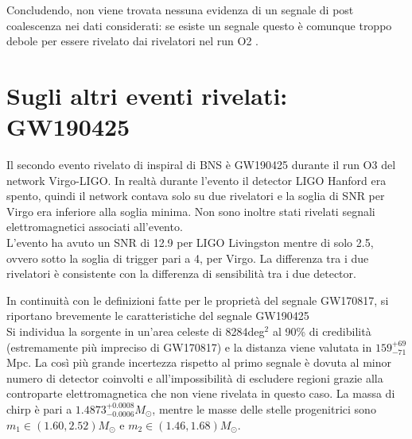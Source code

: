 Concludendo, non viene trovata nessuna evidenza di un segnale di post coalescenza nei dati considerati: se esiste un segnale questo è comunque troppo debole per essere rivelato dai rivelatori nel run O2 \cite{Abbott_2017b}.

\section{Sugli altri eventi rivelati: GW190425}
Il secondo evento rivelato di inspiral di BNS è GW190425 durante il run O3 del network Virgo-LIGO. In realtà durante l'evento il detector LIGO Hanford era spento, quindi il network contava solo su due rivelatori e la soglia di SNR per Virgo era inferiore alla soglia minima. Non sono inoltre stati rivelati segnali elettromagnetici associati all'evento.\\
L'evento ha avuto un SNR di 12.9 per LIGO Livingston mentre di solo 2.5, ovvero sotto la soglia di trigger pari a 4, per Virgo. La differenza tra i due rivelatori è consistente con la differenza di sensibilità tra i due detector\cite{Abbott_2020b}.

In continuità con le definizioni fatte per le proprietà del segnale GW170817, si riportano brevemente le caratteristiche del segnale GW190425\\
Si individua la sorgente in un'area celeste di 8284deg$^2$ al 90\% di credibilità (estremamente più impreciso di GW170817) e la distanza viene valutata in $159_{-71}^{+69}$Mpc. La così più grande incertezza rispetto al primo segnale è dovuta al minor numero di detector coinvolti e all'impossibilità di escludere regioni grazie alla controparte elettromagnetica che non viene rivelata in questo caso.
La massa di chirp è pari a $1.4873^{+0.0008}_{-0.0006}M_\odot$, mentre le masse delle stelle progenitrici sono $m_1 \in (1.60, 2.52)M_\odot$ e $m_2 \in (1.46, 1.68)M_\odot$\cite{Abbott_2020b}.

